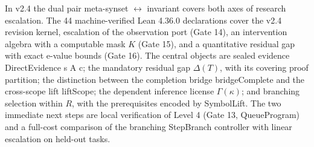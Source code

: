 \documentclass[11pt,a4paper]{article}
\begin{document}
In v2.4 the dual pair meta-synset \(\leftrightarrow\) invariant covers both axes of research escalation. The 44 machine-verified Lean 4.36.0 declarations cover the v2.4 revision kernel, escalation of the observation port (Gate 14), an intervention algebra with a computable mask \(K\) (Gate 15), and a quantitative residual gap with exact e-value bounds (Gate 16). The central objects are sealed evidence DirectEvidence s A c; the mandatory residual gap \(\Delta(T)\), with its covering proof partition; the distinction between the completion bridge bridgeComplete and the cross-scope lift liftScope; the dependent inference license \(\Gamma(\kappa)\); and branching selection within \(R\), with the prerequisites encoded by SymbolLift. The two immediate next steps are local verification of Level 4 (Gate 13, QueueProgram) and a full-cost comparison of the branching StepBranch controller with linear escalation on held-out tasks.
\end{document}
